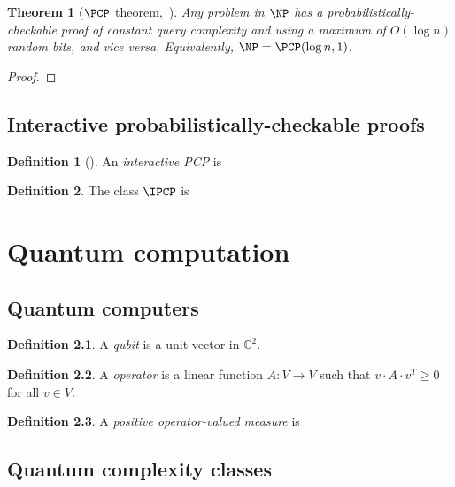 \documentclass[english]{reedthesis}
\theoremstyle{plain}
\newtheorem{thm}{Theorem}[section]
\theoremstyle{definition}
\newtheorem{defn}[defn]{Definition}
\theoremstyle{remark}
\begin{document}
\begin{thm}[{$\PCP$ theorem,~\cite{AS98}}]\label{thm:pcp-theorem}
  Any problem in $\NP$ has a probabilistically-checkable proof of constant query
  complexity and using a maximum of $O(\log n)$ random bits, and vice versa.
  Equivalently, $\NP = \PCP(\log n, 1)$.
\end{thm}

\begin{proof}
\end{proof}

\section{Interactive probabilistically-checkable proofs}\label{sec:ipcp}

\begin{defn}[{\cite[]{KR08}}]\label{defn:ipcp}
  An \emph{interactive PCP} is %
\end{defn}

\begin{defn}\label{defn:ipcp-class}
  The class $\IPCP$ is %
\end{defn}

\chapter{Quantum computation}\label{chap:quantum}

\section{Quantum computers}\label{sec:quant-comp}

\begin{defn}\label{def:qubit}
  A \emph{qubit} is a unit vector in $\mathbb{C}^{2}$.
\end{defn}

\begin{defn}\label{def:operator}
  A \emph{operator} is a linear function $A: V \rightarrow V$ such that
  $v \cdot A \cdot v^{T} \ge 0$ for all $v \in V$.
\end{defn}

\begin{defn}\label{def:povm}
  A \emph{positive operator-valued measure} is
\end{defn}

\section{Quantum complexity classes}
\end{document}
